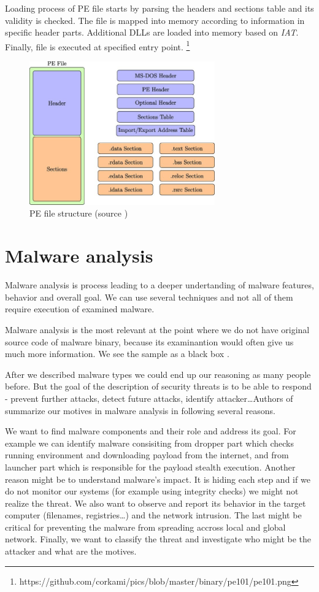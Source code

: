 Loading process of PE file starts by parsing the headers and sections table and its validity is checked. The file is mapped into memory according to information in specific header parts. Additional DLLs are loaded into memory based on \emph{IAT}. Finally, file is executed at specified entry point. \footnote{https://github.com/corkami/pics/blob/master/binary/pe101/pe101.png}


\begin{figure}[h]
  \centering
  \includegraphics[width=8cm]{figures/pe.jpg}
  \caption{PE file structure (source \cite{Gibert2020})}
  \label{fig:pe}
\end{figure}

\section{Malware analysis}
Malware analysis is process leading to a deeper undertanding of malware features, behavior and overall goal. We can use several techniques and not all of them require execution of examined malware.

Malware analysis is the most relevant at the point where we do not have original source code of malware binary, because its examinantion would often give us much more information. We see the sample as a black box \cite{Sikorski2012}.

After we described malware types we could end up our reasoning as many people before. But the goal of the description of security threats is to be able to respond - prevent further attacks, detect future attacks, identify attacker\dots Authors of \cite{KA2018} summarize our motives in malware analysis in following several reasons. 

We want to find malware components and their role and address its goal. For example we can identify malware consisiting from dropper part which checks running environment and downloading payload from the internet, and from launcher part which is responsible for the payload stealth execution. Another reason might be to understand malware's impact. It is hiding each step and if we do not monitor our systems (for example using integrity checks) we might not realize the threat. We also want to observe and report its behavior in the target computer (filenames, registries\dots) and the network intrusion. The last might be critical for preventing the malware from spreading accross local and global network. Finally, we want to classify the threat and investigate who might be the attacker and what are the motives.

